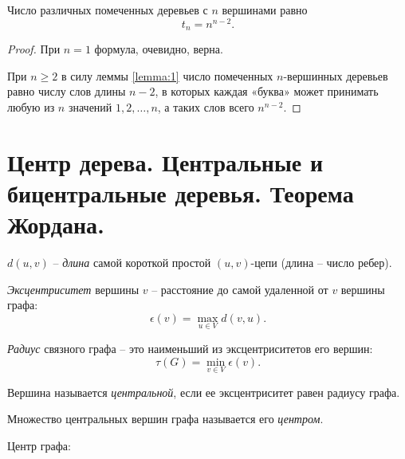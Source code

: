 \begin{theorem}[А. Кэли, 1889]
    Число различных помеченных деревьев с $ n $ вершинами равно
    \[
        t_n = n^{n-2}.
    \]
\end{theorem}

\begin{proof}
    При $ n=1 $ формула, очевидно, верна.

    При $ n \geqslant 2 $ в силу леммы \ref{lemma:1} число помеченных $ n $-вершинных деревьев равно числу слов длины $ n-2 $, в которых каждая «буква» может принимать любую из $ n $ значений $ 1,2,\ldots,n $, а таких слов всего $ n^{n-2} $.
\end{proof}

\section{Центр дерева. Центральные и бицентральные деревья. Теорема Жордана.}

\begin{note}
    $ d(u,v) $ -- \emph{длина} самой короткой простой $ (u,v) $-цепи (длина -- число ребер).
\end{note}

\begin{definition}[Эксцентриситет]
    \emph{Эксцентриситет} вершины $ v $ -- расстояние до самой удаленной от $ v $ вершины графа:
    \[
        \epsilon(v) = \underset{u \in V}{\max}d(v,u).
    \]
\end{definition}

\begin{definition}[Радиус]
    \emph{Радиус} связного графа -- это наименьший из эксцентриситетов его вершин:
    \[
        \tau(G) = \underset{v \in V}{\min}\epsilon(v).
    \]
\end{definition}

\begin{definition}
    Вершина называется \emph{центральной}, если ее эксцентриситет равен радиусу графа.
\end{definition}

\begin{definition}
    Множество центральных вершин графа называется его \emph{центром}.
\end{definition}

\begin{example}
    Центр графа:
    \begin{figure}[H]
        \centering
        \label{fig:fig_25}
    \end{figure}
\end{example}

